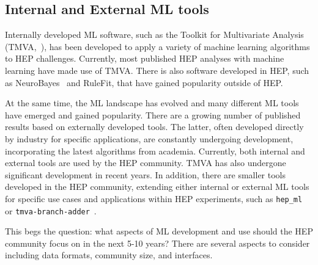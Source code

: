 \subsection{Internal and External ML tools}


Internally developed ML software, such as the Toolkit for Multivariate Analysis (TMVA,~\cite{TMVA}), has been developed to apply a variety of machine learning algorithms to HEP challenges. Currently, most published HEP analyses with machine learning have made use of TMVA. There is also software developed in HEP, such as NeuroBayes~\cite{neurobayes,neurobayes2} and RuleFit, that have gained popularity outside of HEP.

At the same time, the ML landscape has evolved and many different ML tools have emerged and gained popularity. There are a growing number of published results based on externally developed tools. The latter, often developed directly by industry for specific applications, are constantly undergoing development, incorporating the latest algorithms from academia. Currently, both internal and external tools are used by the HEP community. TMVA has also undergone significant development in recent years.
In addition, there are smaller tools developed in the HEP community, extending either internal or external ML tools for specific use cases and applications within HEP experiments, such as \texttt{hep\_ml}~\cite{hep_ml} or \texttt{tmva-branch-adder}~\cite{tmva-branch-adder}.

This begs the question: what aspects of ML development and use should the HEP community focus on in the next 5-10 years? There are several aspects to consider including data formats, community size, and interfaces.

